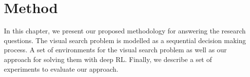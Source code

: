 \chapter{Method}
\label{cha:method}

In this chapter, we present our proposed methodology for answering the research questions.
The visual search problem is modelled as a sequential decision making process.
A set of environments for the visual search problem as well as our approach for solving them with deep RL.
Finally, we describe a set of experiments to evaluate our approach.





